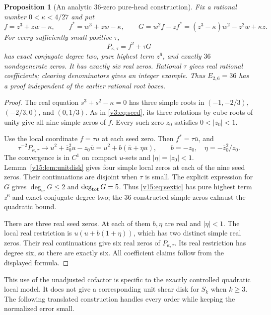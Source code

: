 \documentclass[UTF8,11pt]{ctexart}
\newtheorem{prop}[thm]{Proposition}
\theoremstyle{definition}
\numberwithin{equation}{section}
\begin{document}
\begin{prop}[An analytic $36$-zero pure-head construction]
\label{v15:prop:sextic}
Fix a rational number $0<\kappa<4/27$ and put
\[
 f=z^3+zw-\kappa,\qquad f^*=w^3+zw-\kappa,\qquad
 G=w^2f-zf^*=(z^3-\kappa)w^2-z^2w+\kappa z.
\]
For every sufficiently small positive $\tau$,
\begin{equation}\label{v15:eq:sextic}
 P_{\kappa,\tau}=f^2+\tau G
\end{equation}
has exact conjugate degree two, pure highest term $z^6$, and
exactly $36$ nondegenerate zeros. It has exactly six real zeros.
Rational $\tau$ gives real rational coefficients; clearing
denominators gives an integer example. Thus $E_{2,6}=36$
has a proof independent of the earlier rational root boxes.
\end{prop}
\begin{proof}
The real equation $s^3+s^2-\kappa=0$ has three simple roots
in $(-1,-2/3)$, $(-2/3,0)$, and $(0,1/3)$.
As in \eqref{v3:eq:seed}, its three rotations by cube roots of
unity give all nine simple zeros of $f$. Every such zero $z_0$
satisfies $0<|z_0|<1$.

Use the local coordinate $f=\tau u$ at each seed zero. Then
$f^*=\tau\bar u$, and
\[
 \tau^{-2}P_{\kappa,\tau}
 \longrightarrow u^2+\bar z_0^2u-z_0\bar u
 =u^2+b(\bar u+\eta u),\qquad
 b=-z_0,\quad\eta=-\bar z_0^2/z_0.
\]
The convergence is in $C^1$ on compact $u$-sets and
$|\eta|=|z_0|<1$. Lemma~\ref{v15:lem:unitdisk} gives four
simple local zeros at each of the nine seed zeros. Their
continuations are disjoint when $\tau$ is small.
The explicit expression for $G$ gives
$\deg_wG\le2$ and $\deg_{\rm tot}G=5$. Thus
\eqref{v15:eq:sextic} has pure highest term $z^6$ and
exact conjugate degree two; the $36$ constructed simple zeros
exhaust the quadratic bound.

There are three real seed zeros. At each of them $b,\eta$
are real and $|\eta|<1$. The local real restriction is
$u(u+b(1+\eta))$, which has two distinct simple real zeros.
Their real continuations give six real zeros of
$P_{\kappa,\tau}$. Its real restriction has degree six, so
there are exactly six. All coefficient claims follow from
the displayed formula.
\end{proof}

This use of the unadjusted cofactor is specific to the exactly
controlled quadratic local model. It does not give a corresponding
unit shear disk for $S_k$ when $k\ge3$. The following
translated construction handles every order while keeping the
normalized error small.
\end{document}
